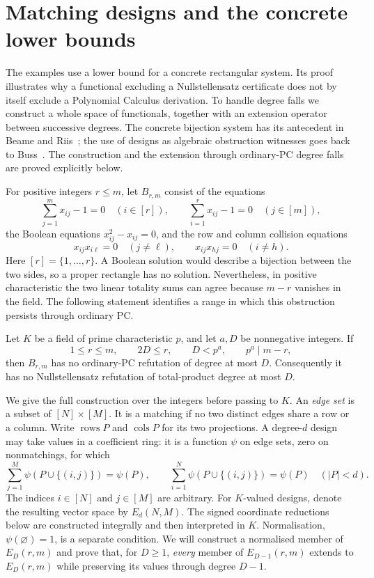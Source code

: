 \section{Matching designs and the concrete lower bounds}
\label{app:matching}

The examples use a lower bound for a concrete rectangular system.  Its
proof illustrates why a functional excluding a Nullstellensatz certificate
does not by itself exclude a Polynomial Calculus derivation.  To handle
degree falls we construct a whole space of functionals, together with an
extension operator between successive degrees. The concrete bijection
system has its antecedent in Beame and Riis~\cite{BeameRiis}; the use of
designs as algebraic obstruction witnesses goes back to Buss~\cite{BussDesign}.
The construction and the extension through ordinary-PC degree falls
are proved explicitly below.

For positive integers $r\leq m$, let $B_{r,m}$ consist of the equations
\[
 \sum_{j=1}^{m}x_{ij}-1=0\quad(i\in[r]),\qquad
 \sum_{i=1}^{r}x_{ij}-1=0\quad(j\in[m]),
\]
the Boolean equations $x_{ij}^{2}-x_{ij}=0$, and the row and column
collision equations
\[
 x_{ij}x_{i\ell}=0\quad(j\ne\ell),\qquad
 x_{ij}x_{hj}=0\quad(i\ne h).
\]
Here $[r]=\{1,\ldots,r\}$.  A Boolean solution would describe a bijection
between the two sides, so a proper rectangle has no solution.  Nevertheless,
in positive characteristic the two linear totality sums can agree because
$m-r$ vanishes in the field.  The following statement identifies a range
in which this obstruction persists through ordinary PC.

\begin{lemma}\label{lem:rectangle-obstruction}
Let $K$ be a field of prime characteristic $p$, and let $a,D$ be
nonnegative integers.  If
\[
 1\leq r\leq m,\qquad 2D\leq r,\qquad D<p^a,
 \qquad p^a\mid m-r,
\]
then $B_{r,m}$ has no ordinary-PC refutation of degree at most $D$.
Consequently it has no Nullstellensatz refutation of total-product degree
at most $D$.
\end{lemma}

We give the full construction over the integers before passing to $K$.
An \emph{edge set} is a subset of $[N]\times[M]$.  It is a matching if
no two distinct edges share a row or a column.  Write $\operatorname{rows}P$
and $\operatorname{cols}P$ for its two projections.  A degree-$d$ design
may take values in a coefficient ring: it is a function $\psi$ on edge
sets, zero on nonmatchings, for which
\begin{equation}\label{eq:matching-design}
 \sum_{j=1}^{M}\psi(P\cup\{(i,j)\})=\psi(P),\qquad
 \sum_{i=1}^{N}\psi(P\cup\{(i,j)\})=\psi(P)
 \quad(|P|<d).
\end{equation}
The indices $i\in[N]$ and $j\in[M]$ are arbitrary. For $K$-valued
designs, denote the resulting vector space by $E_d(N,M)$. The signed
coordinate reductions below are constructed integrally and then
interpreted in $K$.  Normalisation, $\psi(\varnothing)=1$, is a separate
condition.  We will construct a normalised member of $E_D(r,m)$ and prove
that, for $D\ge1$, \emph{every} member of $E_{D-1}(r,m)$ extends to $E_D(r,m)$ while
preserving its values through degree $D-1$.

